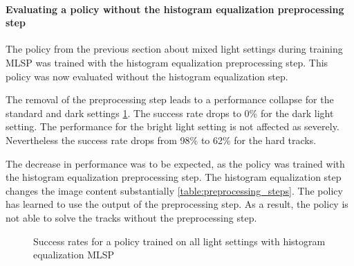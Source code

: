 \paragraph{Evaluating a policy without the histogram equalization preprocessing step}

The policy from the previous section about mixed light settings during training \acs{MLSP} was trained with the histogram equalization preprocessing step. This policy was now evaluated without the histogram equalization step. 

The removal of the preprocessing step leads to a performance collapse for the standard and dark settings \ref{fig:hardDistance_mixedLight_comparison_withWithoutHistogramEqualization}. The success rate drops to 0\% for the dark light setting.
The performance for the bright light setting is not affected as severely. Nevertheless the success rate drops from 98\% to 62\% for the hard tracks.

The decrease in performance was to be expected, as the policy was trained with the histogram equalization preprocessing step. The histogram equalization step changes the image content substantially \ref{table:preprocessing_steps}. The policy has learned to use the output of the preprocessing step. As a result, the policy is not able to solve the tracks without the preprocessing step.

\begin{figure}
    \centering
    \caption{Success rates for a policy trained on all light settings with histogram equalization \acs{MLSP}}
    \label{fig:hardDistance_mixedLight_comparison_withWithoutHistogramEqualization}
\end{figure}


